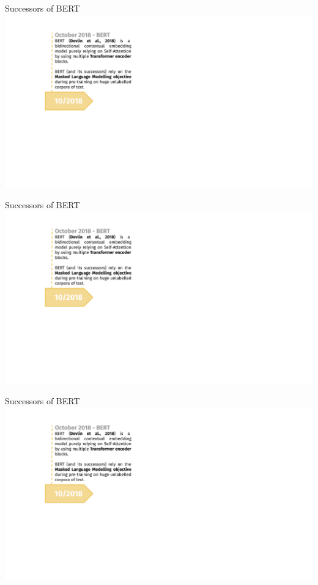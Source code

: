 \documentclass[]{beamer}
\begin{document}
\begin{frame}{Successors of BERT}
\hbox{\hspace{-4.5em} \includegraphics[width=14cm,page=1]{figure/transfer_learning_timeline2_nlp.pdf}}
\end{frame}
\begin{frame}[noframenumbering]{Successors of BERT}
\hbox{\hspace{-4.5em} \includegraphics[width=14cm,page=2]{figure/transfer_learning_timeline2_nlp.pdf}}
\end{frame}
\begin{frame}[noframenumbering]{Successors of BERT}
\hbox{\hspace{-4.5em} \includegraphics[width=14cm,page=3]{figure/transfer_learning_timeline2_nlp.pdf}}
\end{frame}
\end{document}

